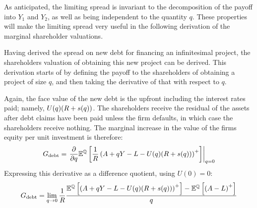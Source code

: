 \documentclass[../main.tex]{subfiles}
\begin{document}
        As anticipated, the limiting spread is invariant to the decomposition of the payoff into $Y_{1}$ and $Y_{2}$,
        as well as being independent to the quantity $q$. 
        These properties will make the limiting spread very useful in the following derivation
        of the marginal shareholder valuations.

        Having derived the spread on new debt for financing an infinitesimal project,
        the shareholders valuation of obtaining this new project can be derived.
        This derivation starts of by defining the payoff to the shareholders 
        of obtaining a project of size $q$,
        and then taking the derivative of that with respect to $q$.
        
        Again, the face value of the new debt is the upfront including the interest rates paid;
        namely, $U(q)(R + s(q))$. 
        The shareholders receive the residual of the assets after debt claims have been paid
        unless the firm defaults, in which case the shareholders receive nothing. 
        The marginal increase in the value of the firms equity per unit investment is therefore:
            \begin{equation*}
                G_{\text{debt}} 
                = 
                \left.
                \frac{
                    \partial 
                }{
                    \partial 
                    q
                }
                \mathbb{E}^{\mathbb{Q}}\left[
                    \frac{1}{R} 
                    \left(
                        A + qY - L - U(q)(R + s(q))
                    \right)^{+}
                \right] 
                \right\rvert_{q=0} 
            \end{equation*}
        Expressing this derivative as a difference quotient, using $U(0)=0$:
            \begin{equation*}
                G_{\text{debt}} 
                =
                \lim_{q\rightarrow0} 
                \frac{1}{R}
                \frac{
                    \mathbb{E}^{\mathbb{Q}}\left[ 
                    \left(
                        A + qY - L - U(q)(R + s(q))
                    \right)^{+}
                    \right]
                    -
                    \mathbb{E}^{\mathbb{Q}}\left[ 
                    \left(
                        A - L
                    \right)^{+}
                \right] 
                }{
                    q
                } 
            \end{equation*}
\end{document}
